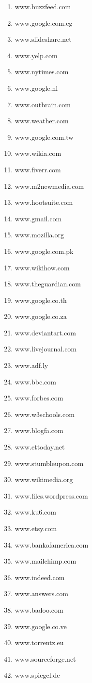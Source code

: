 \begin{enumerate}
\item www.buzzfeed.com
\item www.google.com.eg
\item www.slideshare.net
\item www.yelp.com
\item www.nytimes.com
\item www.google.nl
\item www.outbrain.com
\item www.weather.com
\item www.google.com.tw
\item www.wikia.com
\item www.fiverr.com
\item www.m2newmedia.com
\item www.hootsuite.com
\item www.gmail.com
\item www.mozilla.org
\item www.google.com.pk
\item www.wikihow.com
\item www.theguardian.com
\item www.google.co.th
\item www.google.co.za
\item www.deviantart.com
\item www.livejournal.com
\item www.adf.ly
\item www.bbc.com
\item www.forbes.com
\item www.w3schools.com
\item www.blogfa.com
\item www.ettoday.net
\item www.stumbleupon.com
\item www.wikimedia.org
\item www.files.wordpress.com
\item www.ku6.com
\item www.etsy.com
\item www.bankofamerica.com
\item www.mailchimp.com
\item www.indeed.com
\item www.answers.com
\item www.badoo.com
\item www.google.co.ve
\item www.torrentz.eu
\item www.sourceforge.net
\item www.spiegel.de

\end{enumerate}

